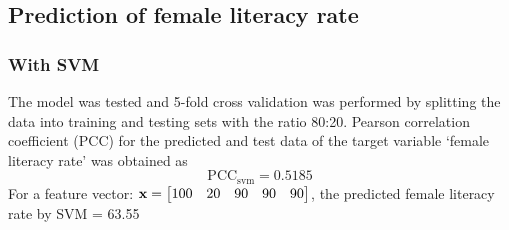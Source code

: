 \documentclass{article}
\def \xx{{\boldsymbol{\rm x}}}
\begin{document}
\subsection{Prediction of female literacy rate}
\subsubsection{With SVM}
The model was tested and 5-fold cross validation was performed by splitting the data into training and testing sets with the ratio 80:20. Pearson correlation coefficient (PCC)  for the predicted and test data of the target variable `female literacy rate' was obtained as 
\begin{equation*}
\text{PCC}_\text{svm} = 0.5185
\end{equation*} 
For a feature vector: $\xx = 
\begin{bmatrix} 
100 & 20 & 90 & 90 & 90 
\end{bmatrix} $, the predicted female literacy rate by SVM = 63.55
\end{document}
